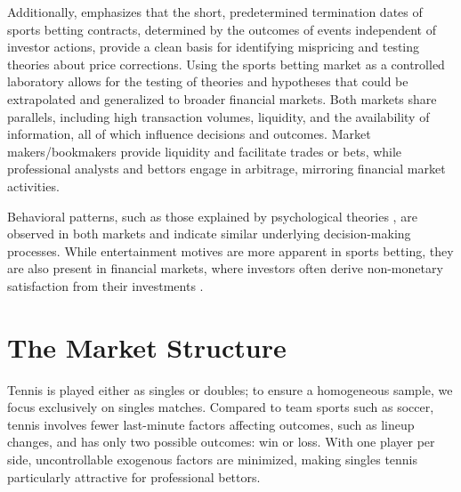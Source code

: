\documentclass[webpdf,modern,medium]{oup-authoring-template}
\theoremstyle{thmstyleone}%
\theoremstyle{thmstyletwo}%
\theoremstyle{thmstylethree}%
\begin{document}
Additionally, \citet{moskowitz2021} emphasizes that the short, predetermined termination dates of sports betting contracts, determined by the outcomes of events independent of investor actions, provide a clean basis for identifying mispricing and testing theories about price corrections.
Using the sports betting market as a controlled laboratory allows for the testing of theories and hypotheses that could be extrapolated and generalized to broader financial markets. Both markets share parallels, including high transaction volumes, liquidity, and the availability of information, all of which influence decisions and outcomes. Market makers/bookmakers provide liquidity and facilitate trades or bets, while professional analysts and bettors engage in arbitrage, mirroring financial market activities.

Behavioral patterns, such as those explained by psychological theories \citep[e.g.,][]{krieger2021,goodell2023}, are observed in both markets and indicate similar underlying decision-making processes. While entertainment motives are more apparent in sports betting, they are also present in financial markets, where investors often derive non-monetary satisfaction from their investments \citep{gao2015}.




\section{The Market Structure}


Tennis is played either as singles or doubles; to ensure a homogeneous sample, we focus exclusively on singles matches. Compared to team sports such as soccer, tennis involves fewer last-minute factors affecting outcomes, such as lineup changes, and has only two possible outcomes: win or loss. With one player per side, uncontrollable exogenous factors are minimized, making singles tennis particularly attractive for professional bettors.
\end{document}
